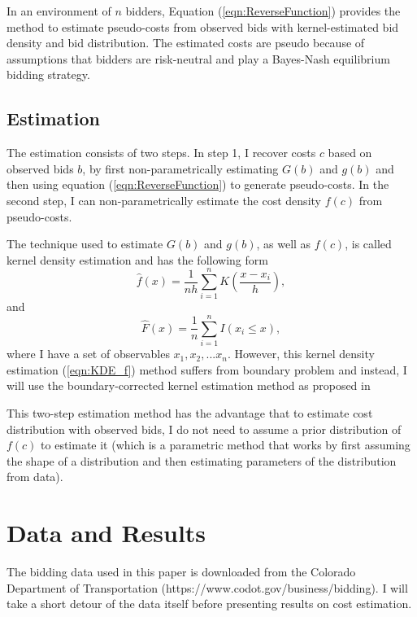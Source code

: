 \documentclass[11pt]{article}
\begin{document}
In an environment of $n$ bidders, Equation (\ref{eqn:ReverseFunction}) provides 
the method to estimate pseudo-costs from observed bids with kernel-estimated 
bid density and bid distribution. The estimated costs are pseudo because of  
assumptions that bidders are risk-neutral and play a Bayes-Nash equilibrium bidding 
strategy. 

\subsection{Estimation}
The estimation consists of two steps. In step 1, I recover costs $c$ based on 
observed bids $b$, by first non-parametrically estimating $G(b)$ and $g(b)$ 
and then using equation (\ref{eqn:ReverseFunction}) to 
generate pseudo-costs. In the second step, I can non-parametrically estimate the cost
density $f(c)$ from pseudo-costs. 

The technique used to estimate $G(b)$ and $g(b)$, as well as $f(c)$, is called 
kernel density estimation and has the following form
\begin{equation}
    \hat{f}(x) = \frac{1}{nh}\sum_{i=1}^n K(\frac{x-x_i}{h}),
    \label{eqn:KDE_f}
\end{equation}
and 
\begin{equation}
    \hat{F}(x) = \frac{1}{n}\sum_{i=1}^n I(x_i \leq x), 
    \label{eqn:KDE_F}
\end{equation}
where I have a set of observables ${x_1, x_2, ... x_n}$. However, this  
kernel density estimation (\ref{eqn:KDE_f}) 
method suffers from boundary 
problem and instead, I will use the boundary-corrected kernel estimation 
method as proposed in \cite{HickmanHubbard2015}

This two-step estimation method has the advantage that to estimate cost 
distribution with observed bids, I do not need to assume a prior distribution 
of $f(c)$ to estimate it (which is a parametric method that works by 
first assuming the shape of a distribution and then estimating parameters of the 
distribution from data). 


\section{Data and Results}
The bidding data used in this paper is downloaded from the Colorado Department of 
Transportation (https://www.codot.gov/business/bidding). I will take a short detour of the data itself before 
presenting results on cost estimation. 
\end{document}
